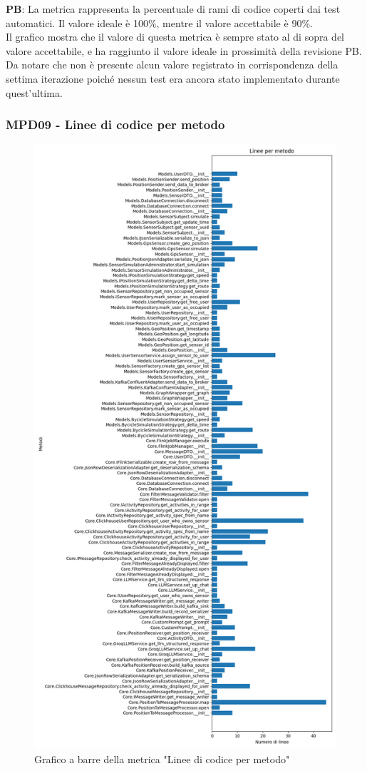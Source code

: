 \documentclass[10pt]{article}
\begin{document}
\begin{justify}
\textbf{PB}: La metrica rappresenta la percentuale di rami di codice coperti dai test automatici. Il valore ideale è 100\%, mentre il valore accettabile è 90\%.\\
Il grafico mostra che il valore di questa metrica è sempre stato al di sopra del valore accettabile, e ha raggiunto il valore ideale in prossimità della revisione PB.\\
Da notare che non è presente alcun valore registrato in corrispondenza della settima iterazione poiché nessun test era ancora stato implementato durante quest'ultima.\\


\subsubsection{MPD09 - Linee di codice per metodo}

\begin{figure}[H]
  \centering
  \includegraphics[width=0.7\linewidth]{metrics_lines.png}
  \caption{Grafico a barre della metrica "Linee di codice per metodo"}
\end{figure}


\end{justify}
\end{document}
